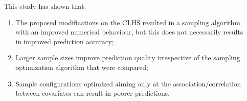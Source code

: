 This study has shown that:

\begin{enumerate}[label = (\Roman*)]
\item The proposed modifications on the CLHS resulted in a sampling algorithm with an improved numerical 
behaviour, but this does not necessarily results in improved prediction accuracy;

\item Larger sample sizes improve prediction quality irrespective of the sampling optimization algorithm that
were compared;

\item Sample configurations optimized aiming only at the association/correlation between covariates can 
result in poorer predictions.
\end{enumerate}

